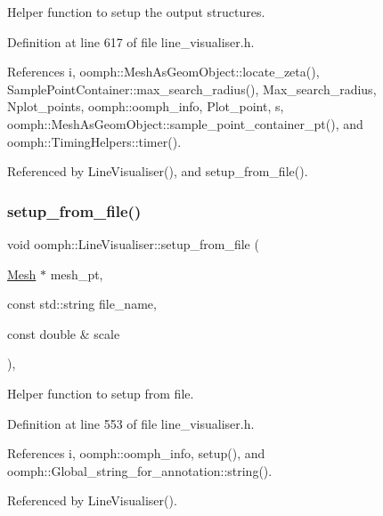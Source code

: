 Helper function to setup the output structures. 



Definition at line 617 of file line\+\_\+visualiser.\+h.



References i, oomph\+::\+Mesh\+As\+Geom\+Object\+::locate\+\_\+zeta(), Sample\+Point\+Container\+::max\+\_\+search\+\_\+radius(), Max\+\_\+search\+\_\+radius, Nplot\+\_\+points, oomph\+::oomph\+\_\+info, Plot\+\_\+point, s, oomph\+::\+Mesh\+As\+Geom\+Object\+::sample\+\_\+point\+\_\+container\+\_\+pt(), and oomph\+::\+Timing\+Helpers\+::timer().



Referenced by Line\+Visualiser(), and setup\+\_\+from\+\_\+file().

\mbox{\label{classoomph_1_1LineVisualiser_adfa22f79f20d300d045f2ef730f466ce}} 
\subsubsection{\texorpdfstring{setup\+\_\+from\+\_\+file()}{setup\_from\_file()}}
{\footnotesize\ttfamily void oomph\+::\+Line\+Visualiser\+::setup\+\_\+from\+\_\+file (\begin{DoxyParamCaption}\item[{\hyperlink{classoomph_1_1Mesh}{Mesh} $\ast$}]{mesh\+\_\+pt,  }\item[{const std\+::string}]{file\+\_\+name,  }\item[{const double \&}]{scale }\end{DoxyParamCaption})\hspace{0.3cm}{\ttfamily [inline]}, {\ttfamily [private]}}



Helper function to setup from file. 



Definition at line 553 of file line\+\_\+visualiser.\+h.



References i, oomph\+::oomph\+\_\+info, setup(), and oomph\+::\+Global\+\_\+string\+\_\+for\+\_\+annotation\+::string().



Referenced by Line\+Visualiser().

